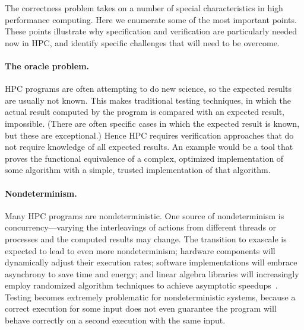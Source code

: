 
The correctness problem takes on a number of special characteristics in high performance computing.  Here we enumerate some of the most important points.  These points illustrate why specification and verification are particularly needed now in HPC, and identify specific challenges that will need to be overcome.

\paragraph{The oracle problem.}
HPC programs are often attempting to do new science, so the expected results are usually not known.  This makes traditional testing techniques, in which the actual result computed by the program is compared with an expected result, impossible.  (There are often specific cases in which the expected result is known, but these are exceptional.)  Hence HPC requires verification approaches that do not require knowledge of all expected results.  An example would be a tool that proves the functional equivalence of a complex, optimized implementation of some algorithm with a simple, trusted implementation of that algorithm.


\paragraph{Nondeterminism.}
Many HPC programs are nondeterministic.  One source of nondeterminism is concurrency---varying the interleavings of actions from different threads or processes and the computed results may change.  The transition to exascale is expected to lead to even more nondeterminism; hardware components will dynamically adjust their execution rates; software implementations will embrace asynchrony to save time and energy; and linear algebra libraries will increasingly employ randomized algorithm techniques to achieve asymptotic speedups~\cite{spielman2004nearly}.  Testing becomes extremely problematic for nondeterministic systems,  because a correct execution for some input does not even guarantee the program will behave correctly on a second execution with the same input.

